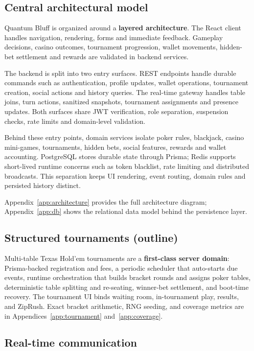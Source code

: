 \documentclass[11pt,a4paper]{article}
\begin{document}
\subsection{Central architectural model}

Quantum Bluff is organized around a \textbf{layered architecture}. The React client handles navigation, rendering, forms and immediate feedback. Gameplay decisions, casino outcomes, tournament progression, wallet movements, hidden-bet settlement and rewards are validated in backend services.

The backend is split into two entry surfaces. REST endpoints handle durable commands such as authentication, profile updates, wallet operations, tournament creation, social actions and history queries. The real-time gateway handles table joins, turn actions, sanitized snapshots, tournament assignments and presence updates. Both surfaces share JWT verification, role separation, suspension checks, rate limits and domain-level validation.

Behind these entry points, domain services isolate poker rules, blackjack, casino mini-games, tournaments, hidden bets, social features, rewards and wallet accounting. PostgreSQL stores durable state through Prisma; Redis supports short-lived runtime concerns such as token blacklist, rate limiting and distributed broadcasts. This separation keeps UI rendering, event routing, domain rules and persisted history distinct.

Appendix~\ref{app:architecture} provides the full architecture diagram; Appendix~\ref{app:db} shows the relational data model behind the persistence layer.

\subsection{Structured tournaments (outline)}

Multi-table Texas Hold'em tournaments are a \textbf{first-class server domain}: Prisma-backed registration and fees, a periodic scheduler that auto-starts due events, runtime orchestration that builds bracket rounds and assigns poker tables, deterministic table splitting and re-seating, winner-bet settlement, and boot-time recovery. The tournament UI binds waiting room, in-tournament play, results, and ZipRush. Exact bracket arithmetic, RNG seeding, and coverage metrics are in Appendices~\ref{app:tournament} and~\ref{app:coverage}.

\subsection{Real-time communication}
\label{sec:realtime}
\end{document}

